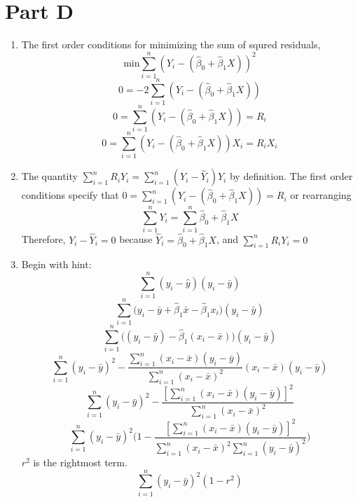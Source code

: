 \documentclass{article}
\newcommand{\sumin}{\sum_{i=1}^n}
\newcommand{\xibar}{ (x_i - \bar{x})}
\newcommand{\yibar}{ (y_i - \bar{y})}
\newcommand{\covxy}{\sumin \xibar \yibar }
\begin{document}
\section*{Part D}
\begin{enumerate}
  \item The first order conditions for minimizing the sum of squred residuals, 
  $$
  \text{min} \sum_{i=1}^n (Y_i  - (\hat{\beta}_0 + \hat{\beta}_1 X))^2
  $$
  $$
  0 = -2 \sum_{i=1}^n (Y_i  - (\hat{\beta}_0 + \hat{\beta}_1 X)) 
  $$
  $$
  0 = \sum_{i=1}^n (Y_i  - (\hat{\beta}_0 + \hat{\beta}_1 X)) = R_i
  $$
  $$
  0 =  \sum_{i=1}^n (Y_i  - (\hat{\beta}_0 + \hat{\beta}_1 X))X_i = R_i X_i
  $$
  
  \item The quantity $ \sum_{i=1}^{n} R_i Y_i = \sum_{i=1}^{n} (Y_i - \hat{Y}_i) Y_i $ by definition. The first order conditions specify that   $ 0 = \sum_{i=1}^n (Y_i  - (\hat{\beta}_0 + \hat{\beta}_1 X)) = R_i $ or rearranging $$  \sum_{i=1}^n Y_i  = \sum_{i=1}^n  \hat{\beta}_0 + \hat{\beta}_1 X  $$ Therefore, $ Y_i - \hat{Y}_i = 0 $ because $ \hat{Y}_i = \hat{\beta}_0 + \hat{\beta}_1 X $, and  $ \sum_{i=1}^{n} R_i Y_i = 0 $
  
  \item Begin with hint:
  $$
  \sumin (y_i - \hat{y}) \yibar
  $$
  $$
  \sumin \big(  y_i - \bar{y} + \hat{\beta}_1 \bar{x} - \hat{\beta}_1x_i \big) \yibar
  $$
  $$
  \sumin \big(  \yibar - \hat{\beta}_1 \xibar \big) \yibar
  $$
  $$
  \sumin \yibar^2 - \frac{\covxy}{\sumin \xibar^2} \xibar\yibar
  $$
  $$
  \sumin \yibar^2 - \frac{[\covxy]^2}{\sumin \xibar^2}
  $$
  $$
  \sumin \yibar^2\Big(  1 - \frac{[\covxy]^2}{\sumin \xibar^2 \sumin\yibar^2}  \Big)
  $$
  $r^2$ is the rightmost term. 
  $$
  \sumin \yibar^2 (1 - r^2) 
  $$
\end{enumerate}
\end{document}
